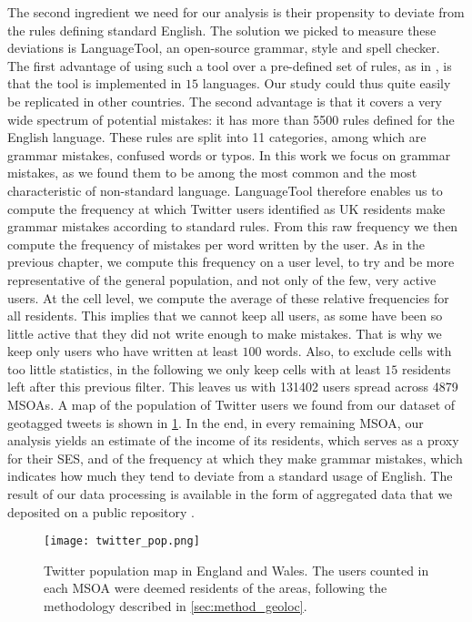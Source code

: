 \documentclass[../thesis.tex]{subfiles}
\begin{document}
The second ingredient we need for our analysis is their propensity to deviate from the
rules defining standard English. The solution we picked to measure these deviations is
LanguageTool, an open-source grammar, style and spell checker. The first advantage of
using such a tool over a pre-defined set of rules, as in
\cite{AbitbolSocioeconomicDependencies2018}, is that the tool is implemented in $15$
languages. Our study could thus quite easily be replicated in other countries. The
second advantage is that it covers a very wide spectrum of potential mistakes: it has
more than \SI{5500}{} rules defined for the English language. These rules are split into
11 categories, among which are grammar mistakes, confused words or typos. In this work
we focus on grammar mistakes, as we found them to be among the most common and the most
characteristic of non-standard language. LanguageTool therefore enables us to compute
the frequency at which Twitter users identified as UK residents make grammar mistakes
according to standard rules. From this raw frequency we then compute the frequency of
mistakes per word written by the user. As in the previous chapter, we compute this
frequency on a user level, to try and be more representative of the general population,
and not only of the few, very active users. At the cell level, we compute the average of
these relative frequencies for all residents. This implies that we cannot keep all
users, as some have been so little active that they did not write enough to make
mistakes. That is why we keep only users who have written at least $100$ words. Also, to exclude
cells with too little statistics, in the following we only keep cells with at least $15$
residents left after this previous filter. This leaves us with \SI{131402}{} users
spread across \SI{4879}{} \acp{MSOA}. A map of the population of Twitter users we found
from our dataset of geotagged tweets is shown in \cref{fig:EW_twitter_pop}. In the end,
in every remaining \ac{MSOA}, our analysis yields an estimate of the income of its
residents, which serves as a proxy for their \ac{SES}, and of the frequency at which
they make grammar mistakes, which indicates how much they tend to deviate from a
standard usage of English. The result of our data processing is available in the form of
aggregated data that we deposited on a public repository
\cite{LoufFrequencyDetected2023}.
\begin{figure}
\centering
  \texttt{[image: twitter\_pop.png]}
  \caption{Twitter population map in England and Wales. The users counted in each
  \ac{MSOA} were deemed residents of the areas, following the methodology described in
  \cref{sec:method_geoloc}.}
  \label{fig:EW_twitter_pop}
\end{figure}
\end{document}
